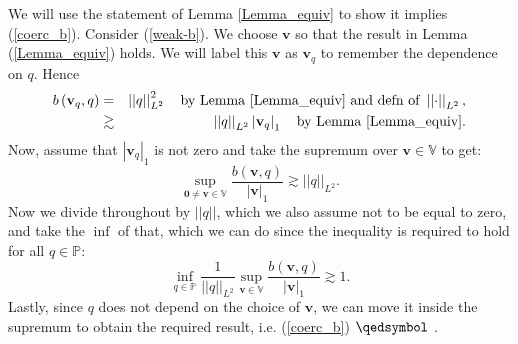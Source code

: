 \documentclass[12pt,a4paper]{article}
\theoremstyle{definition}
\begin{document}
We will use the statement of Lemma \ref{Lemma_equiv} to show it implies (\ref{coerc_b}).  Consider (\ref{weak-b}).  We choose $\textbf{v}$ so that the result in Lemma (\ref{Lemma_equiv}) holds. We will label this $\textbf{v}$ as $\textbf{v}_q$ to remember the dependence on $q$.   Hence
\begin{eqnarray}
b\left(\textbf{v}_q,q\right) &=& \left|\left|q\right|\right|_{L^2}^2 \quad\text{by Lemma \ref{Lemma_equiv}  and defn of } \nonumber \left|\left|\cdot\right|\right|_{L^2},\\
&\gtrsim& \left|\left|q\right|\right|_{L^2} \left|\textbf{v}_q\right|_1\quad \text{by Lemma \ref{Lemma_equiv}}.\nonumber
\end{eqnarray}
Now, assume that $\left|\textbf{v}_q\right|_1$ is not zero and take the supremum over $\textbf{v}\in \mathbb{V}$ to get:
\begin{equation}
\sup_{\textbf{0}\neq\textbf{v}\in \mathbb{V}}\frac{b\left(\textbf{v},q\right)}{\left|\textbf{v}\right|_1} \gtrsim \left|\left|q\right|\right|_{L^2}.\nonumber
\end{equation}
Now we divide throughout by $\left|\left|q\right|\right|$, which we also assume not to be equal to zero, and take the $\inf$ of that, which we can do since the inequality is required to hold for all $q\in \mathbb{P}$:
\begin{equation}
\inf_{q\in \mathbb{P}}\frac{1}{\left|\left|q\right|\right|_{L^2}}\sup_{\textbf{v}\in \mathbb{V}}\frac{b\left(\textbf{v},q\right)}{\left|\textbf{v}\right|_1} \gtrsim 1 \nonumber.
\end{equation}
Lastly, since $q$ does not depend on the choice of $\textbf{v}$, we can move it inside the supremum to obtain the required result, i.e. (\ref{coerc_b}) $\qedsymbol$ .  
\end{document}
